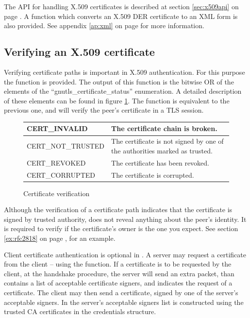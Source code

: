 The API for handling X.509 certificates is described at section \ref{sec:x509api}
on page \pageref{sec:x509api}. A function which converts an X.509 DER certificate
to an XML form is also provided. See appendix \ref{ap:xml} on page \pageref{ap:xml} for
more information.


\subsection{Verifying an X.509 certificate}
Verifying certificate paths is important 
in X.509 authentication. For this purpose the function
 is provided. The
output of this function is the bitwise OR of the elements of the
``gnutls\_certificate\_status'' enumeration. A detailed description of
these elements can be found in figure \ref{fig:verify}.
The function 
is equivalent to the previous one, and will verify the peer's certificate in a TLS session.

\begin{figure}[hbtp]
\begin{tabular}{|l|p{9cm}|}

\hline
CERT\_INVALID & The certificate chain is broken. 
\\
\hline
CERT\_NOT\_TRUSTED & The certificate is not signed by one of the authorities marked as trusted.
\\
\hline
CERT\_REVOKED & The certificate has been revoked.
\\
\hline
CERT\_CORRUPTED & The certificate is corrupted.
\\
\hline
\end{tabular}
\caption{Certificate verification}
\label{fig:verify}
\end{figure}

\par
Although the verification of a certificate path indicates that the
certificate is signed by trusted authority, does not reveal anything
about the peer's identity. It is required to verify if the certificate's
owner is the one you expect. See section \ref{ex:rfc2818} on page \pageref{ex:rfc2818},
for an example.




\par
Client certificate authentication is 
optional in \tls{}. A server may request a certificate from the client -- using the
function. If a certificate is to be requested by the client, at the handshake 
procedure, the server will send an extra packet,
than contains a list of acceptable certificate signers, and indicates the
request of a certificate. The client may then send a certificate, signed
by one of the server's acceptable signers. In \gnutls{} the server's acceptable
signers list is constructed using the trusted CA certificates in the
credentials structure.


